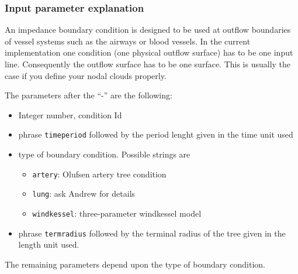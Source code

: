 \subsubsection*{Input parameter explanation}
An impedance boundary condition is designed to be used at outflow boundaries of
vessel systems such as the airways or blood vessels. In the current implementation 
one condition (one physical outflow surface) has to be one input line. Consequently
the outflow surface has to be one surface. This is usually the case if you define your
nodal clouds properly.
\par
The parameters after the ``-'' are the following:
\begin{itemize}
\item Integer number, condition Id
\item phrase \texttt{timeperiod} followed by the period lenght given in the time 
      unit used
\item type of boundary condition. Possible strings are
    \begin{itemize}
      \item \texttt{artery}: Olufsen artery tree condition
      \item \texttt{lung}: ask Andrew for details
      \item \texttt{windkessel}: three-parameter windkessel model
    \end{itemize}
\item phrase \texttt{termradius} followed by the terminal radius of the tree given
      in the length unit used.
\end{itemize}
The remaining parameters depend upon the type of boundary condition.
